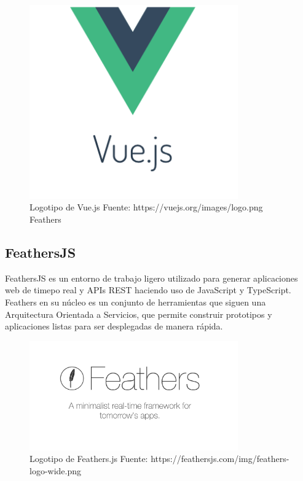 \begin{figure}[H]
\centering
\includegraphics[width=0.80\textwidth]{img/8.png}
\caption{Logotipo de Vue.js
Fuente: https://vuejs.org/images/logo.png
Feathers}
\label{figure:VueLogo}
\end{figure}

\subsection{FeathersJS}

FeathersJS es un entorno de trabajo ligero utilizado para generar aplicaciones web de timepo real y APIs REST haciendo uso de JavaScript y TypeScript. Feathers en su núcleo es un conjunto de herramientas  que siguen una Arquitectura Orientada a Servicios, que permite construir prototipos y aplicaciones listas para ser desplegadas de manera rápida.

\begin{figure}[H]
\centering
\includegraphics[width=0.80\textwidth]{img/9.png}
\caption{Logotipo de Feathers.js
Fuente: https://feathersjs.com/img/feathers-logo-wide.png}
\label{figure:FeathersLogo}
\end{figure}

